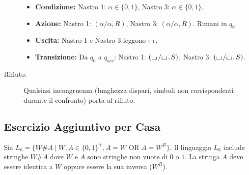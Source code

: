 \documentclass[a4paper]{article}
\theoremstyle{definition} %
\newcommand{\blankS}{\ensuremath{\raisebox{-0.15ex}{\scalebox{1.3}[0.7]{$\sqcup$}}\mkern2mu}}
\begin{document}
\begin{description}
    \begin{itemize}
        \item \textbf{Condizione:} Nastro 1: $\alpha \in \{0,1\}$, Nastro 3: $\alpha \in \{0,1\}$.
        \item \textbf{Azione:} Nastro 1: $(\alpha/\alpha, R)$, Nastro 3: $(\alpha/\alpha, R)$. Rimani in $q_6$.
        \item \textbf{Uscita:} Nastro 1 e Nastro 3 leggono $\blankS$.
        \item \textbf{Transizione:} Da $q_6$ a $q_{acc}$: Nastro 1: $(\blankS/\blankS, S)$, Nastro 3: $(\blankS/\blankS, S)$.
    \end{itemize}
    \item[Rifiuto:] Qualsiasi incongruenza (lunghezza dispari, simboli non corrispondenti durante il confronto) porta al rifiuto.
\end{description}

\subsection{Esercizio Aggiuntivo per Casa}
Sia $L_6 = \{W\#A \mid W,A \in \{0,1\}^+, A=W \text{ OR } A=W^R\}$.
Il linguaggio $L_6$ include stringhe $W\#A$ dove $W$ e $A$ sono stringhe non vuote di $0$ o $1$. La stringa $A$ deve essere identica a $W$ oppure essere la sua inversa ($W^R$).
\end{document}
